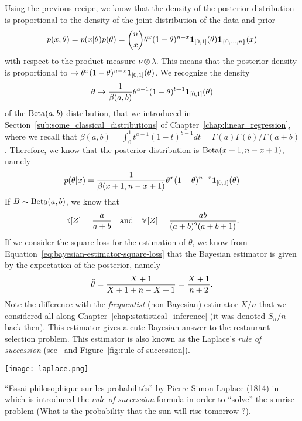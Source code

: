 Using the previous recipe, we know that the density of the posterior distribution is proportional to the density of the joint distribution of the data and prior
\begin{equation*}{}
	p(x, \theta) = p(x | \theta) p(\theta) = \binom{n}{x} \theta^x (1 - \theta)^{n - x} \mathbf 1_{[0, 1]}(\theta) \mathbf 1_{\{ 0, \ldots, n\}}(x)
\end{equation*}
with respect to the product measure $\nu \otimes \lambda$.
This means that the posterior density is proportional to $\mapsto \theta^x (1 - \theta)^{n - x} \mathbf 1_{[0, 1]}(\theta)$. 
We recognize the density
\begin{equation*}
	\theta \mapsto \frac{1}{\beta(a, b)} \theta^{a-1} (1 - \theta)^{b-1} \mathbf 1_{[0, 1]}(\theta)
\end{equation*}
 of the $\operatorname{Beta}(a, b)$ distribution, that we introduced in Section~\ref{sub:some_classical_distributions} of Chapter~\ref{chap:linear_regression},
where we recall that $\beta(a, b) = \int_0^1 t^{a-1} (1 - t)^{b-1} d t = \Gamma(a) \Gamma(b)  / \Gamma(a + b)$.
Therefore, we know that the posterior distribution is $\operatorname{Beta}(x + 1, n - x + 1)$, namely
\begin{equation*}
	p(\theta | x) = \frac{1}{\beta(x + 1, n - x + 1)} \theta^{x} (1 - \theta)^{n-x} \mathbf 1_{[0, 1]}(\theta)
\end{equation*}
If $B \sim \operatorname{Beta}(a, b)$, we know that
\begin{equation*}
	\mathbb E[Z] = \frac{a}{a + b} \quad \text{and} \quad \mathbb V[Z] = \frac{ab}{(a + b)^2 (a + b + 1)}.
\end{equation*}
If we consider the square loss for the estimation of $\theta$, we know from Equation~\eqref{eq:bayesian-estimator-square-loss} that the Bayesian estimator is given by the expectation of the posterior, namely
\begin{equation*}
	\widehat \theta = \frac{X + 1}{X + 1 + n - X + 1} = \frac{X + 1}{n + 2}.
\end{equation*}
Note the difference with the \emph{frequentist} (non-Bayesian) estimator $X / n$ that we considered all along Chapter~\ref{chap:statistical_inference} (it was denoted $S_n / n$ back then).
This estimator gives a cute Bayesian answer to the restaurant selection problem.
This estimator is also known as the Laplace's \emph{rule of succession} (see~ and Figure~\ref{fig:rule-of-succession}).
\begin{marginfigure}[*2]
	\texttt{[image: laplace.png]}
	\caption{``Essai philosophique sur les probabilités'' by Pierre-Simon Laplace (1814) in which is introduced the \emph{rule of succession} formula in order to ``solve'' the sunrise problem (What is the probability that the sun will rise tomorrow ?).}
	\label{fig:rule-of-succession}
\end{marginfigure}

